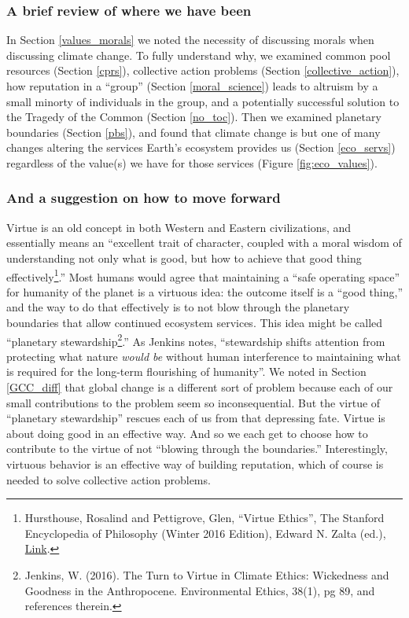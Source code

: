 \subsubsection{A brief review of where we have been}
In Section \ref{values_morals} we noted the necessity of discussing morals when discussing climate change. To fully understand why, we examined common pool resources (Section \ref{cprs}), collective action problems (Section \ref{collective_action}), how reputation in a ``group'' (Section \ref{moral_science}) leads to altruism by a small minorty of individuals in the group, and a potentially successful solution to the Tragedy of the Common (Section \ref{no_toc}). Then we examined planetary boundaries (Section \ref{pbs}), and found that climate change is but one of many changes altering the services Earth's ecosystem provides us (Section \ref{eco_servs}) regardless of the value(s) we have for those services (Figure \ref{fig:eco_values}). 
   
\subsubsection{And a suggestion on how to move forward}
Virtue is an old concept in both Western and Eastern civilizations, and essentially means an ``excellent trait of character, coupled with a moral wisdom of understanding not only what is good, but how to achieve that good thing effectively\footnote{Hursthouse, Rosalind and Pettigrove, Glen, ``Virtue Ethics'', The Stanford Encyclopedia of Philosophy (Winter 2016 Edition), Edward N. Zalta (ed.), \href{https://plato.stanford.edu/archives/win2016/entries/ethics-virtue/}{Link}.}.'' Most humans would agree that maintaining a ``safe operating space'' for humanity of the planet is a virtuous idea: the outcome itself is a ``good thing,'' and the way to do that effectively is to not blow through the planetary boundaries that allow continued ecosystem services. This idea might be called ``planetary stewardship\footnote{Jenkins, W. (2016). The Turn to Virtue in Climate Ethics: Wickedness and Goodness in the Anthropocene. Environmental Ethics, 38(1), pg 89, and references therein.}.'' As Jenkins notes, ``stewardship shifts attention from protecting what nature \emph{would be} without human interference to maintaining what is required for the long-term flourishing of humanity''. We noted in Section \ref{GCC_diff} that global change is a different sort of problem because each of our small contributions to the problem seem so inconsequential. But the virtue of ``planetary stewardship'' rescues each of us from that depressing fate. Virtue is about doing good in an effective way. And so we each get to choose how to contribute to the virtue of not ``blowing through the boundaries.'' Interestingly, virtuous behavior is an effective way of building reputation, which of course is needed to solve collective action problems. 

